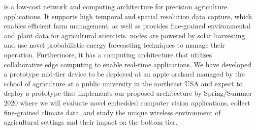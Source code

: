 \myname{} is a low-cost network and computing architecture for precision agriculture applications. It supports high temporal and spatial resolution data capture, which enables efficient farm management, as well as provides fine-grained environmental and plant data for agricultural scientists. \myname{} nodes are powered by solar harvesting and use novel probabilistic energy forecasting techniques to manage their operation. Furthermore, it has a computing architecture that utilizes collaborative edge computing to enable real-time applications.  We have developed a prototype mid-tier device to be deployed at an apple orchard managed by the school of agriculture at a public university in the northeast USA and expect to deploy a prototype that implements our proposed architecture by Spring/Summer 2020 where we will evaluate novel embedded computer vision applications, collect fine-grained climate data, and study the unique wireless environment of agricultural settings and their impact on the bottom tier.

